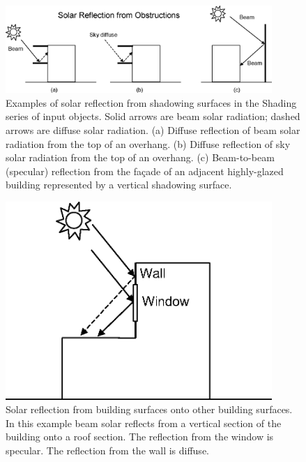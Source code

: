 \begin{figure}[hbtp] %
\centering
\includegraphics[width=0.9\textwidth, height=0.9\textheight, keepaspectratio=true]{media/image670.png}
\caption{   Examples of solar reflection from shadowing surfaces in the Shading series of input objects. Solid arrows are beam solar radiation; dashed arrows are diffuse solar radiation. (a) Diffuse reflection of beam solar radiation from the top of an overhang. (b) Diffuse reflection of sky solar radiation from the top of an overhang. (c) Beam-to-beam (specular) reflection from the façade of an adjacent highly-glazed building represented by a vertical shadowing surface. \protect \label{fig:examples-of-solar-reflection-from-shadowing}}
\end{figure}

\begin{figure}[hbtp] %
\centering
\includegraphics[width=0.9\textwidth, height=0.9\textheight, keepaspectratio=true]{media/image671.png}
\caption{   Solar reflection from building surfaces onto other building surfaces. In this example beam solar reflects from a vertical section of the building onto a roof section. The reflection from the window is specular. The reflection from the wall is diffuse. \protect \label{fig:solar-reflection-from-building-surfaces-onto}}
\end{figure}

